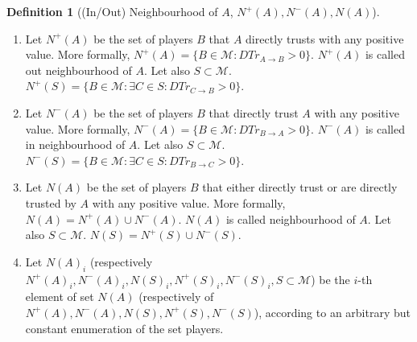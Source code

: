 \documentclass[11pt]{article}
\theoremstyle{definition}
\newtheorem{definition}{Definition}[section]
\theoremstyle{corollary}
\theoremstyle{lemma}
\begin{document}
      \begin{definition}[(In/Out) Neighbourhood of $A$, $N^{+}(A), N^{-}(A), N(A)$] \ 
         \begin{enumerate}
            \item Let $N^{+}(A)$ be the set of players $B$ that $A$ directly trusts with any positive value. More
               formally, $N^{+}(A) = \{B \in \mathcal{M} : DTr_{A \rightarrow B} > 0\}$. $N^{+}(A)$ is called out
               neighbourhood of $A$. Let also $S \subset \mathcal{M}$. $N^{+}(S) = \{B \in \mathcal{M} : \exists C \in S :
               DTr_{C \rightarrow B} > 0\}$.
            \item Let $N^{-}(A)$ be the set of players $B$ that directly trust $A$ with any positive value. More
               formally, $N^{-}(A) = \{B \in \mathcal{M} : DTr_{B \rightarrow A} > 0\}$. $N^{-}(A)$ is called in
               neighbourhood of $A$. Let also $S \subset \mathcal{M}$. $N^{-}(S) = \{B \in \mathcal{M} : \exists C \in S :
               DTr_{B \rightarrow C} > 0\}$.
            \item Let $N(A)$ be the set of players $B$ that either directly trust or are directly trusted by $A$ with
               any positive value. More formally, $N(A) = N^{+}(A) \cup N^{-}(A)$. $N(A)$ is called
               neighbourhood of $A$. Let also $S \subset \mathcal{M}$. $N(S) = N^{+}(S) \cup N^{-}(S)$.
            \item Let $N(A)_i$ (respectively $N^{+}(A)_i, N^{-}(A)_i, N(S)_i, N^{+}(S)_i, N^{-}(S)_i, S \subset \mathcal{M}$)
               be the $i$-th element of set $N(A)$ (respectively of $N^{+}(A), N^{-}(A), N(S), N^{+}(S), N^{-}(S)$),
               according to an arbitrary but constant enumeration of the set players.
         \end{enumerate}
      \end{definition}
\end{document}
